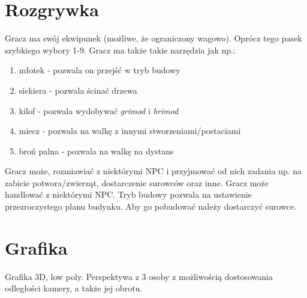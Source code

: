 \documentclass[12pt]{article}
\begin{document}
	\section{Rozgrywka}
	Gracz ma swój ekwipunek (możliwe, że ograniczony wagowo). Oprócz tego pasek szybkiego wybory 1-9.\newline\newline
	Gracz ma także takie narzędzia jak np.:
	\begin{enumerate}
		\item młotek - pozwala on przejść w tryb budowy
		\item siekiera - pozwala ścinać drzewa
		\item kilof - pozwala wydobywać \textit{grimod} i \textit{brimod}
		\item miecz - pozwala na walkę z innymi stworzeniami/postaciami
		\item broń palna - pozwala na walkę na dystans
	\end{enumerate}
	Gracz może, rozmiawiać z niektórymi NPC i przyjmować od nich zadania np. na zabicie potwora/zwierząt, dostarczenie surowców oraz inne.\newline\newline
	Gracz może handlować z niektórymi NPC.
	\newline\newline
	Tryb budowy pozwala na ustawienie przezroczystego planu budynku. Aby go pobudować należy dostarczyć surowce.
	
	\section{Grafika}
	Grafika 3D, low poly. Perspektywa z 3 osoby z możliwością dostosowania odległości kamery, a także jej obrotu.
\end{document}
